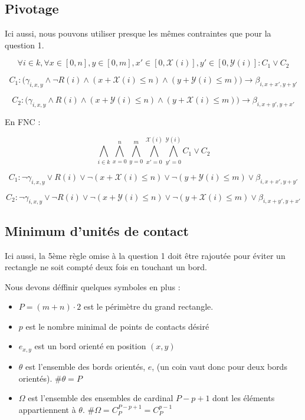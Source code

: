 \documentclass[a4paper]{article}
\begin{document}
\subsection{Pivotage}

Ici aussi, nous pouvons utiliser presque les mêmes contraintes que pour la question 1.

$$
\forall i \in k,
\forall x \in [0, n] , y \in [0, m],
x' \in [0, \mathcal{X}(i)], y' \in [0, \mathcal{Y}(i)] : C_1 \lor C_2
$$

$$
C_1 : \Big(
\gamma_{i, x, y} \land \lnot R(i)
\land (x + \mathcal{X}(i) \leq n)
\land (y + \mathcal{Y}(i) \leq m)
\Big)
\rightarrow \beta_{i, x + x', y + y'}
$$

$$
C_2 : \Big(
\gamma_{i, x, y} \land R(i)
\land (x + \mathcal{Y}(i) \leq n)
\land (y + \mathcal{X}(i) \leq m)
\Big)
\rightarrow \beta_{i, x + y', y + x'}
$$

En FNC :

$$
\bigwedge_{i \in k}
\bigwedge_{x=0}^{n} \bigwedge_{y=0}^{m}
\bigwedge_{x'=0}^{\mathcal{X}(i)} \bigwedge_{y'=0}^{\mathcal{Y}(i)} C_1 \lor C_2
$$

$$
C_1 :
\lnot \gamma_{i, x, y} \lor R(i)
\lor \lnot (x + \mathcal{X}(i) \leq n)
\lor \lnot (y + \mathcal{Y}(i) \leq m)
\lor \beta_{i, x + x', y + y'}
$$

$$
C_2 :
\lnot \gamma_{i, x, y} \lor \lnot R(i)
\lor \lnot (x + \mathcal{Y}(i) \leq n)
\lor \lnot (y + \mathcal{X}(i) \leq m)
\lor \beta_{i, x + y', y + x'}
$$


\subsection{Minimum d'unités de contact}

Ici aussi, la 5ème règle omise à la question 1 doit être rajoutée pour éviter un rectangle ne soit compté deux fois en touchant un bord.

Nous devons déffinir quelques symboles en plus :
\begin{itemize}
  \item $P = (m + n) \cdot 2$ est le périmètre du grand rectangle.
  \item $p$ est le nombre minimal de points de contacts désiré
  \item $e_{x,y}$ est un bord orienté en position $(x,y)$
  \item $\theta$ est l'ensemble des bords orientés, $e$,  (un coin vaut donc pour deux bords orientés). $\#\theta = P$
  \item $\Omega$ est l'ensemble des ensembles de cardinal $P-p+1$ dont les éléments appartiennent à $\theta$.
    $\#\Omega = C_P^{P-p+1} = C_P^{p-1}$
\end{itemize}
\end{document}
